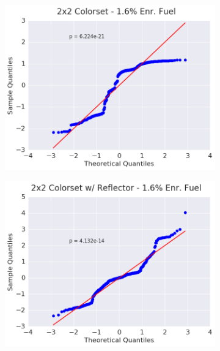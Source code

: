 \begin{figure}[h!]
\begin{subfigure}{0.5\textwidth}
  \centering
  \includegraphics[width=\linewidth]{figures/patterns/2x2/quantile/16-enr-fiss-2}
  \caption{}
  \label{fig:chap9-qq-2x2-1.6-fiss}
\end{subfigure}%
\begin{subfigure}{0.5\textwidth}
  \centering
  \includegraphics[width=\linewidth]{figures/patterns/reflector/quantile/16-enr-fiss-2}  \caption{}
  \label{fig:chap9-qq-reflector-1.6-fiss}
\end{subfigure}
\begin{subfigure}{0.5\textwidth}
  \centering

\end{subfigure}
\end{figure}
